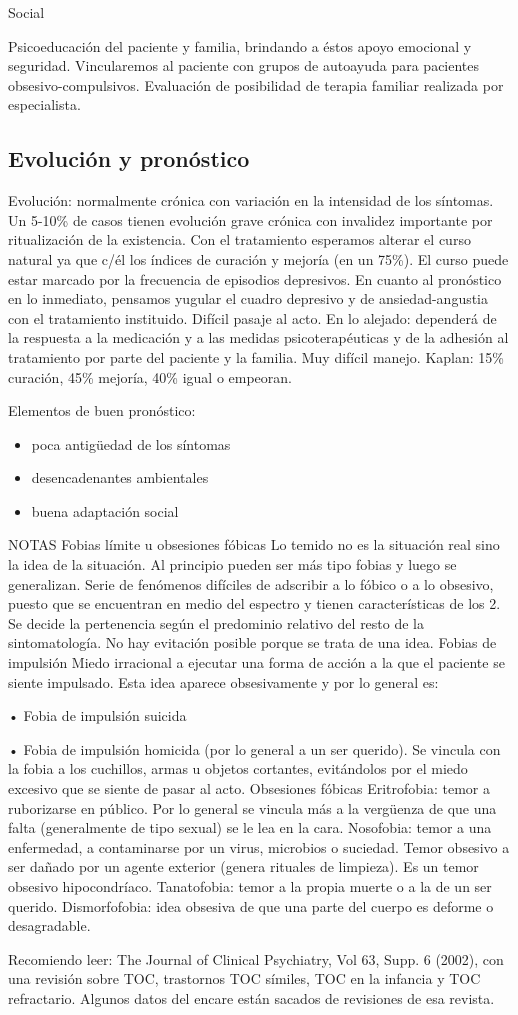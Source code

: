 Social

Psicoeducación del paciente y familia, brindando a éstos apoyo emocional y seguridad. Vincularemos al paciente con grupos de autoayuda para pacientes obsesivo-compulsivos. Evaluación de posibilidad de terapia familiar realizada por especialista.

\subsection*{Evolución y pronóstico}

Evolución: normalmente crónica con variación en la intensidad de los síntomas. Un 5-10\% de casos tienen evolución grave crónica con invalidez importante por ritualización de la existencia. Con el tratamiento esperamos alterar el curso natural ya que c/él los índices de curación y mejoría (en un 75\%). El curso puede estar marcado por la frecuencia de episodios depresivos. En cuanto al pronóstico en lo inmediato, pensamos yugular el cuadro depresivo y de ansiedad-angustia con el tratamiento instituido. Difícil pasaje al acto. En lo alejado: dependerá de la respuesta a la medicación y a las medidas psicoterapéuticas y de la adhesión al tratamiento por parte del paciente y la familia. Muy difícil manejo. Kaplan: 15\% curación, 45\% mejoría, 40\% igual o empeoran.

Elementos de buen pronóstico:

\begin{itemize}
	\item poca antigüedad de los síntomas
	\item desencadenantes ambientales
	\item buena adaptación social
\end{itemize}

NOTAS Fobias límite u obsesiones fóbicas Lo temido no es la situación real sino la idea de la situación. Al principio pueden ser más tipo fobias y luego se generalizan. Serie de fenómenos difíciles de adscribir a lo fóbico o a lo obsesivo, puesto que se encuentran en medio del espectro y tienen características de los 2. Se decide la pertenencia según el predominio relativo del resto de la sintomatología. No hay evitación posible porque se trata de una idea. Fobias de impulsión Miedo irracional a ejecutar una forma de acción a la que el paciente se siente impulsado. Esta idea aparece obsesivamente y por lo general es:

• Fobia de impulsión suicida

• Fobia de impulsión homicida (por lo general a un ser querido). Se vincula con la fobia a los cuchillos, armas u objetos cortantes, evitándolos por el miedo excesivo que se siente de pasar al acto. Obsesiones fóbicas Eritrofobia: temor a ruborizarse en público. Por lo general se vincula más a la vergüenza de que una falta (generalmente de tipo sexual) se le lea en la cara. Nosofobia: temor a una enfermedad, a contaminarse por un virus, microbios o suciedad. Temor obsesivo a ser dañado por un agente exterior (genera rituales de limpieza). Es un temor obsesivo hipocondríaco. Tanatofobia: temor a la propia muerte o a la de un ser querido. Dismorfofobia: idea obsesiva de que una parte del cuerpo es deforme o desagradable.

Recomiendo leer: The Journal of Clinical Psychiatry, Vol 63, Supp. 6 (2002), con una revisión sobre TOC, trastornos TOC símiles, TOC en la infancia y TOC refractario. Algunos datos del encare están sacados de revisiones de esa revista.
\printbibliography

